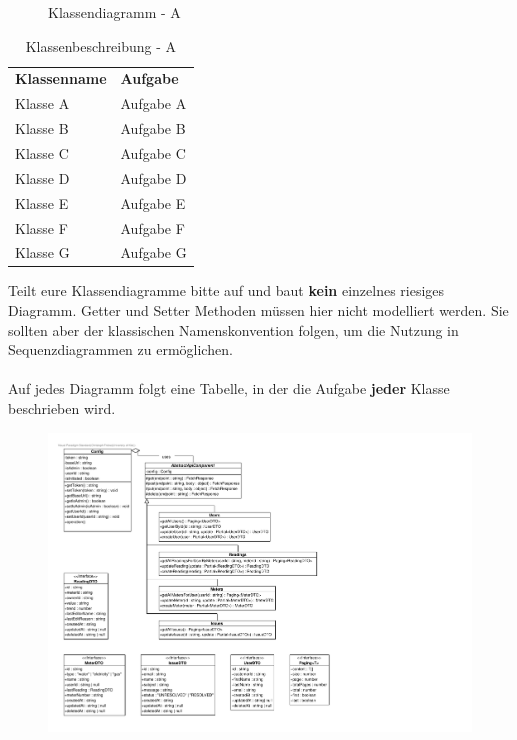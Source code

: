\begin{figure}[h]
	\centering
	\caption{Klassendiagramm - A}
	\label{fig:klassendiagramm-a}
\end{figure}

\begin{table}[h]
	\centering
	\begin{tabularx}{\textwidth}{X X}
		\rowcolor[HTML]{C0C0C0} 
		\textbf{Klassenname} & \textbf{Aufgabe} \\
		Klasse A & Aufgabe A \\
		\rowcolor[HTML]{E7E7E7} 
		Klasse B & Aufgabe B \\
		Klasse C & Aufgabe C \\
		\rowcolor[HTML]{E7E7E7} 
		Klasse D & Aufgabe D \\
		Klasse E & Aufgabe E \\
		\rowcolor[HTML]{E7E7E7} 
		Klasse F & Aufgabe F \\
		Klasse G & Aufgabe G
	\end{tabularx}
	\caption{Klassenbeschreibung - A}
	\label{table:klassenbeschreibung-a}
\end{table}

\begin{tcolorbox}
Teilt eure Klassendiagramme bitte auf und baut \textbf{kein} einzelnes riesiges Diagramm.
Getter und Setter Methoden müssen hier nicht modelliert werden.
Sie sollten aber der klassischen Namenskonvention folgen, um die Nutzung in Sequenzdiagrammen zu ermöglichen.
\\\\
Auf jedes Diagramm folgt eine Tabelle, in der die Aufgabe \textbf{jeder} Klasse beschrieben wird.
\end{tcolorbox}

\begin{figure}[h]
	\hspace{-3cm}
	\includegraphics{./img/Diagrams/api-classDiagram}
\end{figure}

